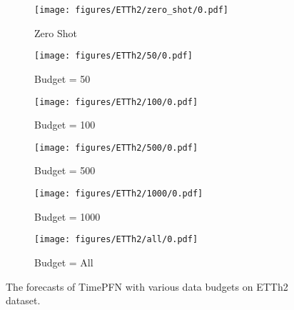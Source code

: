 \begin{figure*}[htp]
\centering

\begin{subfigure}{0.32\textwidth}
\texttt{[image: figures/ETTh2/zero\_shot/0.pdf]}
\caption{Zero Shot}
\end{subfigure}\hfill
\begin{subfigure}{0.32\textwidth}
\texttt{[image: figures/ETTh2/50/0.pdf]}
\caption{Budget = 50}
\end{subfigure}\hfill
\begin{subfigure}{0.32\textwidth}
\texttt{[image: figures/ETTh2/100/0.pdf]}
\caption{Budget = 100}
\end{subfigure}

\begin{subfigure}{0.32\textwidth}
\texttt{[image: figures/ETTh2/500/0.pdf]}
\caption{Budget = 500}
\end{subfigure}\hfill
\begin{subfigure}{0.32\textwidth}
\texttt{[image: figures/ETTh2/1000/0.pdf]}
\caption{Budget = 1000}
\end{subfigure}\hfill
\begin{subfigure}{0.32\textwidth}
\texttt{[image: figures/ETTh2/all/0.pdf]}
\caption{Budget = All}
\end{subfigure}

\caption{The forecasts of TimePFN with various data budgets on ETTh2 dataset. }

\label{fig:etth2_0}
\end{figure*}